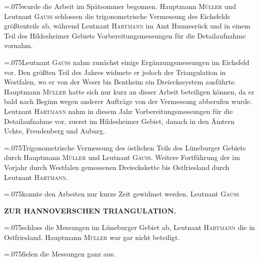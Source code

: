 {\hangindent=.075\linewidth{}\noindent{}wurde die Arbeit im Spätsommer begonnen. Hauptmann \textsc{Müller} und Leutnant \textsc{Gauss} schlossen die trigonometrische Vermessung des Eichsfelds größtenteils ab, während Leutnant \textsc{Hartmann} im Amt Hunnesrück und in einem Teil des Hildesheimer Gebiets Vorbereitungsmessungen für die Detailaufnahme vornahm.\par}

{\hangindent=.075\linewidth{}\noindent{}\enspace Leutnant \textsc{Gauss} nahm zunächst einige Ergänzungsmessungen im Eichsfeld vor. Den größten Teil des Jahres widmete er jedoch der Triangulation in Westfalen, wo er von der Weser bis Bentheim ein Dreieckssystem ausführte. Hauptmann \textsc{Müller} hatte sich nur kurz an dieser Arbeit beteiligen können, da er bald nach Beginn wegen anderer Aufträge von der Vermessung abberufen wurde. Leutnant \textsc{Hartmann} nahm in diesem Jahr Vorbereitungsmessungen für die Detailaufnahme vor, zuerst im Hildesheimer Gebiet, danach in den Ämtern Uchte, Freudenberg und Auburg.\par}

{\hangindent=.075\linewidth{}\noindent{}\enspace Trigonometrische Vermessung des östlichen Teils des Lüneburger Gebiets durch Hauptmann \textsc{Müller} und Leutnant \textsc{Gauss}. Weitere Fortführung der im Vorjahr durch Westfalen gemessenen Dreieckskette bis Ostfriesland durch Leutnant \textsc{Hartmann}.\par}

{\hangindent=.075\linewidth{}\noindent{}konnte den Arbeiten nur kurze Zeit gewidmet werden. Leutnant \textsc{Gauss}\par}

\par\clearpage
\noindent\null\hfill{\small\textbf{ZUR HANNOVERSCHEN TRIANGULATION.}}\hfill{}\par\medskip

{\leftskip=.075\linewidth\noindent schloss die Messungen im Lüneburger Gebiet ab, Leutnant \textsc{Hartmann} die in Ostfriesland. Hauptmann \textsc{Müller} war gar nicht beteiligt.\par}

{\hangindent=.075\linewidth{}\noindent{}fielen die Messungen ganz aus.\par}

